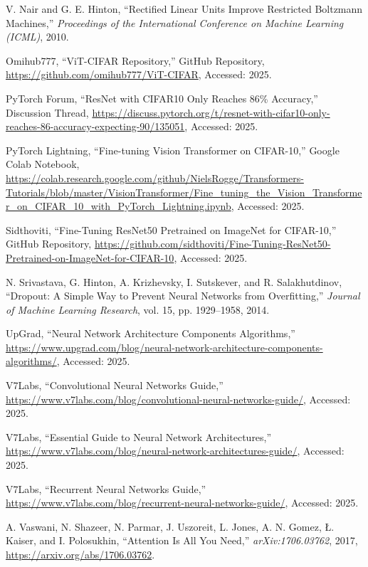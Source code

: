 \documentclass[UTF8]{report}
\theoremstyle{MyLineTheoremStyle} %
\theoremstyle{MyBlockTheoremStyle} %
\theoremstyle{MySubsubsectionStyle} %
\begin{document}
\begin{thebibliography}{99}
V. Nair and G. E. Hinton, ``Rectified Linear Units Improve Restricted Boltzmann Machines,'' \textit{Proceedings of the International Conference on Machine Learning (ICML)}, 2010.

Omihub777, ``ViT-CIFAR Repository,'' GitHub Repository, \url{https://github.com/omihub777/ViT-CIFAR}, Accessed: 2025.

PyTorch Forum, ``ResNet with CIFAR10 Only Reaches 86\% Accuracy,'' Discussion Thread, \url{https://discuss.pytorch.org/t/resnet-with-cifar10-only-reaches-86-accuracy-expecting-90/135051}, Accessed: 2025.

PyTorch Lightning, ``Fine-tuning Vision Transformer on CIFAR-10,'' Google Colab Notebook, \url{https://colab.research.google.com/github/NielsRogge/Transformers-Tutorials/blob/master/VisionTransformer/Fine_tuning_the_Vision_Transformer_on_CIFAR_10_with_PyTorch_Lightning.ipynb}, Accessed: 2025.

Sidthoviti, ``Fine-Tuning ResNet50 Pretrained on ImageNet for CIFAR-10,'' GitHub Repository, \url{https://github.com/sidthoviti/Fine-Tuning-ResNet50-Pretrained-on-ImageNet-for-CIFAR-10}, Accessed: 2025.

N. Srivastava, G. Hinton, A. Krizhevsky, I. Sutskever, and R. Salakhutdinov, ``Dropout: A Simple Way to Prevent Neural Networks from Overfitting,'' \textit{Journal of Machine Learning Research}, vol. 15, pp. 1929--1958, 2014.

UpGrad, ``Neural Network Architecture Components Algorithms,'' \url{https://www.upgrad.com/blog/neural-network-architecture-components-algorithms/}, Accessed: 2025.

V7Labs, ``Convolutional Neural Networks Guide,'' \url{https://www.v7labs.com/blog/convolutional-neural-networks-guide/}, Accessed: 2025.

V7Labs, ``Essential Guide to Neural Network Architectures,'' \url{https://www.v7labs.com/blog/neural-network-architectures-guide/}, Accessed: 2025.

V7Labs, ``Recurrent Neural Networks Guide,'' \url{https://www.v7labs.com/blog/recurrent-neural-networks-guide/}, Accessed: 2025.

A. Vaswani, N. Shazeer, N. Parmar, J. Uszoreit, L. Jones, A. N. Gomez, Ł. Kaiser, and I. Polosukhin, ``Attention Is All You Need,'' \textit{arXiv:1706.03762}, 2017, \url{https://arxiv.org/abs/1706.03762}.


\end{thebibliography}
\end{document}
